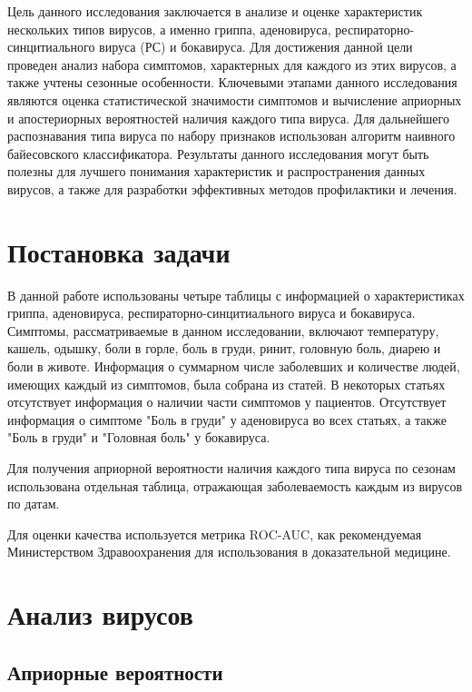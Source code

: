 \documentclass{article}
\begin{document}
 Цель данного исследования заключается в анализе и оценке характеристик нескольких типов вирусов, а именно гриппа, аденовируса, респираторно-синцитиального вируса (РС) и бокавируса. Для достижения данной цели проведен анализ набора симптомов, характерных для каждого из этих вирусов, а также учтены сезонные особенности. Ключевыми этапами данного исследования являются оценка статистической значимости симптомов и вычисление априорных и апостериорных вероятностей наличия каждого типа вируса. Для дальнейшего распознавания типа вируса по набору признаков использован алгоритм наивного байесовского классификатора. Результаты данного исследования могут быть полезны для лучшего понимания характеристик и распространения данных вирусов, а также для разработки эффективных методов профилактики и лечения.

\section{Постановка задачи}
\label{sec:headings}

В данной работе использованы четыре таблицы с информацией о характеристиках гриппа, аденовируса, респираторно-синцитиального вируса и бокавируса. Симптомы, рассматриваемые в данном исследовании, включают температуру, кашель, одышку, боли в горле, боль в груди, ринит, головную боль, диарею и боли в животе. Информация о суммарном числе заболевших и количестве людей, имеющих каждый из симптомов, была собрана из статей. В некоторых статьях отсутствует информация о наличии части симптомов у пациентов. Отсутствует информация о симптоме{ }"Боль в груди"{ }у аденовируса во всех статьях, а также{ }"Боль в груди"{ }и{ }"Головная боль"{ }у бокавируса.

Для получения априорной вероятности наличия каждого типа вируса по сезонам  использована отдельная таблица, отражающая заболеваемость каждым из вирусов по датам. 

Для оценки качества используется метрика ROC-AUC, как рекомендуемая Министерством Здравоохранения для использования в доказательной медицине.

\section{Анализ вирусов}

\subsection{Априорные вероятности}
\end{document}
